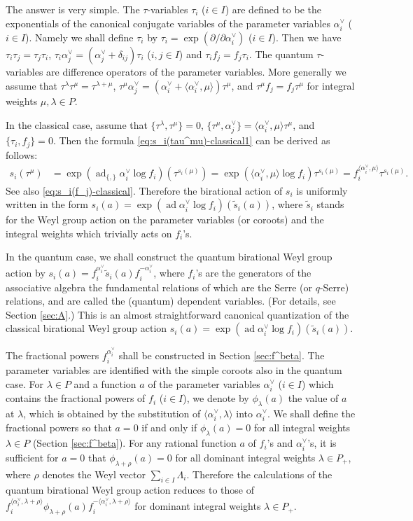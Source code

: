 \documentclass[12pt,twoside]{article}
\newcommand\bra{\langle}
\newcommand\ket{\rangle}
\newcommand\ad{\mathop{\mathrm{ad}}\nolimits}
\newcommand\av{\alpha^\vee}
\newcommand\ts{{\tilde s}}
\renewcommand\d{\partial}
\theoremstyle{plain} %
\theoremstyle{definition} %
\theoremstyle{definition} %
\numberwithin{theorem}{section}
\numberwithin{equation}{section}
\numberwithin{figure}{section}
\numberwithin{table}{section}
\newcommand\secref[1]{Section \ref{#1}}
\begin{document}
The answer is very simple. 
The $\tau$-variables $\tau_i$ ($i\in I$) are defined 
to be the exponentials of the canonical conjugate variables 
of the parameter variables $\av_i$ ($i\in I$).
Namely we shall define $\tau_i$ by $\tau_i = \exp(\d/\d\av_i)$ ($i\in I$). 
Then we have $\tau_i\tau_j=\tau_j\tau_i$, $\tau_i\av_j=(\av_j+\delta_{ij})\tau_i$ ($i,j\in I$)
and $\tau_i f_j = f_j \tau_i$.
The quantum $\tau$-variables are difference operators 
of the parameter variables.
More generally we assume that $\tau^\lambda\tau^\mu=\tau^{\lambda+\mu}$, 
$\tau^\mu\av_j=(\av_i+\bra\av_i,\mu\ket)\tau^\mu$,
and $\tau^\mu f_j=f_j\tau^\mu$
for integral weights $\mu,\lambda\in P$.

In the classical case, 
assume that $\{\tau^\lambda,\tau^\mu\}=0$,
$\{\tau^\mu,\av_j\}=\bra\av_i,\mu\ket\tau^\mu$, and $\{\tau_i,f_j\}=0$.
Then the formula \eqref{eq:s_i(tau^mu)-classical1} can be derived as follows: 
\begin{align}
 s_i(\tau^\mu) 
 &
 = \exp(\ad_{\{,\}} \av_i \log f_i)(\tau^{s_i(\mu)})
 = \exp(\bra\av_i,\mu\ket \log f_i)\tau^{s_i(\mu)}
 = f_i^{\bra\av_i,\mu\ket}\tau^{s_i(\mu)}.
 \label{eq:s_i(tau^mu)-classical2}
\end{align}
See also \eqref{eq:s_i(f_j)-classical}.
Therefore the birational action of $s_i$ is uniformly written in the form 
$s_i(a) = \exp(\ad \av_i\log f_i)(\ts_i(a))$,
where $\ts_i$ stands for the Weyl group action on the parameter variables
(or coroots) and the integral weights which trivially acts on $f_i$'s.

In the quantum case, we shall construct the quantum birational Weyl group action by
$s_i(a)=f_i^{\av_i} \ts_i(a) f_i^{-\av_i}$, 
where $f_i$'s are the generators of 
the associative algebra the fundamental relations of which
are the Serre (or $q$-Serre) relations,
and are called the (quantum) dependent variables.
(For details, see \secref{sec:A}.)
This is an almost straightforward canonical quantization 
of the classical birational Weyl group action $s_i(a) = \exp(\ad \av_i\log f_i)(\ts_i(a))$.

The fractional powers $f_i^{\av_i}$ shall be constructed in \secref{sec:f^beta}.
The parameter variables are identified with the simple coroots also in the quantum case. 
For $\lambda\in P$ and a function $a$ of the parameter variables $\av_i$ ($i\in I$) 
which contains the fractional powers of $f_i$ ($i\in I$), 
we denote by $\phi_\lambda(a)$ the value of $a$ at $\lambda$, 
which is obtained by the substitution of $\bra\av_i,\lambda\ket$ into $\av_i$.
We shall define the fractional powers so that $a=0$ if and only if $\phi_\lambda(a)=0$
for all integral weights $\lambda\in P$ (\secref{sec:f^beta}).
For any rational function $a$ of $f_i$'s and $\av_i$'s,
it is sufficient for $a=0$ that $\phi_{\lambda+\rho}(a)=0$ 
for all dominant integral weights $\lambda\in P_+$,
where $\rho$ denotes the Weyl vector $\sum_{i\in I}\Lambda_i$.
Therefore the calculations of the quantum birational Weyl group action
reduces to those of 
$f_i^{\bra\av_i,\lambda+\rho\ket} \phi_{\lambda+\rho}(a) f_i^{-\bra\av_i,\lambda+\rho\ket}$ 
for dominant integral weights $\lambda\in P_+$.
\end{document}
